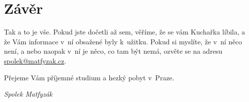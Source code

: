 \section{Závěr}

Tak a to je vše. Pokud jste dočetli až sem, věříme, že se vám
Kuchařka líbila, a že Vám informace v~ní obsažené byly k~užitku.
Pokud si myslíte, že v~ní něco není, a nebo naopak v~ní je něco,
co tam být nemá, ozvěte se na adresu \url{spolek@matfyzak.cz}.

\medskip

Přejeme Vám příjemné studium a hezký pobyt v~Praze.

\hskip 8cm \it Spolek Matfyzák